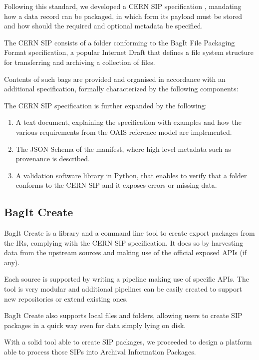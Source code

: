 \documentclass[11pt]{IEEEtran}
\begin{document}
Following this standard, we developed a CERN SIP specification \cite{CERNDigitalMemorySIPSpecGitLab-2021-09-15}, mandating how a data record can be packaged, in which form its payload must be stored and how should the required and optional metadata be specified.

The CERN SIP consists of a folder conforming to the BagIt File Packaging Format specification, a popular Internet Draft that defines a file system structure for transferring and archiving a collection of files.

Contents of such bags are provided and organised in accordance with an additional specification, formally characterized by the following components:

The CERN SIP specification is further expanded by the following:

\begin{enumerate}
    \item A text document, explaining the specification with examples and how the various requirements from the OAIS reference model are implemented.
    \item The JSON Schema of the manifest, where high level metadata such as provenance is described.
    \item A validation software library in Python, that enables to verify that a folder conforms to the CERN SIP and it exposes errors or missing data.
\end{enumerate}

\subsection{BagIt Create}

BagIt Create is a library and a command line tool to create export packages from the IRs, complying with the CERN SIP specification. It does so by harvesting data from the upstream sources and making use of the official exposed APIs (if any).

Each source is supported by writing a pipeline making use of specific APIs. The tool is very modular and additional pipelines can be easily created to support new repositories or extend existing ones.

BagIt Create also supports local files and folders, allowing users to create SIP packages in a quick way even for data simply lying on disk.

With a solid tool able to create SIP packages, we proceeded to design a platform able to process those SIPs into Archival Information Packages.
\end{document}
